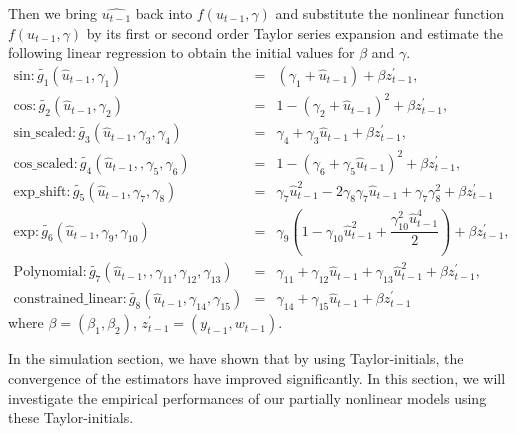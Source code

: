 \documentclass[a4paper,12pt,times,numbered,print,index]{report}
\numberwithin{equation}{section}
\begin{document}
Then we bring $\hat{u_{t-1}}$ back into $f\left( u_{t-1},\gamma \right)$ and substitute the nonlinear function $f\left( u_{t-1},\gamma \right)$ by its first or second order Taylor series expansion and estimate the following linear regression to obtain the initial values for $\beta$ and $\gamma$.
\begin{eqnarray*}
	\text{sin}: \tilde{g_{1}}\left( \hat{u}_{t-1},\gamma _{1}\right) &=& \left( \gamma_{1} +\hat{u}_{t-1}\right) + \beta z_{t-1}^{\prime},  \\
	\text{cos}: \tilde{g_{2}}\left( \hat{u}_{t-1},\gamma _{2}\right) &=& 1 - \left( \gamma_{2} + \hat{u}_{t-1}\right)^2  + \beta z_{t-1}^{\prime}, \\
	\text{sin\_scaled}: \tilde{g_{3}}\left( \hat{u}_{t-1},\gamma_{3},\gamma_{4}\right) &=& \gamma_{4}  + \gamma_{3}\hat{u}_{t-1} + \beta z_{t-1}^{\prime},  \\
	\text{cos\_scaled}: \tilde{g_{4}}\left( \hat{u}_{t-1},,\gamma_{5},\gamma_{6}\right) &=& 1 - \left( \gamma_{6} + \gamma_{5}\hat{u}_{t-1}\right)^2  + \beta z_{t-1}^{\prime}, \\
	\text{exp\_shift}: \tilde{g_{5}}\left( \hat{u}_{t-1},\gamma_{7},\gamma_{8}\right) &=&  \gamma_{7}\hat{u}_{t-1}^2 - 2\gamma_{8}\gamma_{7}\hat{u}_{t-1} + \gamma_{7}\gamma_{8}^2 + \beta z_{t-1}^{\prime} \\
	\text{exp}: \tilde{g_{6}}\left( \hat{u}_{t-1},\gamma_{9},\gamma_{10}\right) &=&  \gamma_{9}(1-\gamma_{10}\hat{u}_{t-1}^2 + \dfrac{\gamma_{10}^2 \hat{u}_{t-1}^4}{2}) + \beta z_{t-1}^{\prime}, \\
	\text{Polynomial}: \tilde{g_{7}}\left( \hat{u}_{t-1},,\gamma_{11},\gamma_{12},\gamma_{13}\right) &=& \gamma_{11}+ \gamma_{12}\hat{u}_{t-1}+\gamma_{13}\hat{u}_{t-1}^{2}+\beta z_{t-1}^{\prime}, \\
	\text{constrained\_linear}: \tilde{g_{8}}\left( \hat{u}_{t-1},\gamma_{14}, \gamma_{15}\right) &=& \gamma_{14}+ \gamma_{15}\hat{u}_{t-1}+\beta z_{t-1}^{\prime}
\end{eqnarray*}%
where $\beta = (\beta_{1}, \beta_{2})$, $ z_{t-1}^{\prime } = (y_{t-1}, w_{t-1})$.

In the simulation section, we have shown that by using Taylor-initials, the convergence of the estimators have improved significantly. In this section, we will investigate the empirical performances of our partially nonlinear models using these Taylor-initials.


\end{document}
